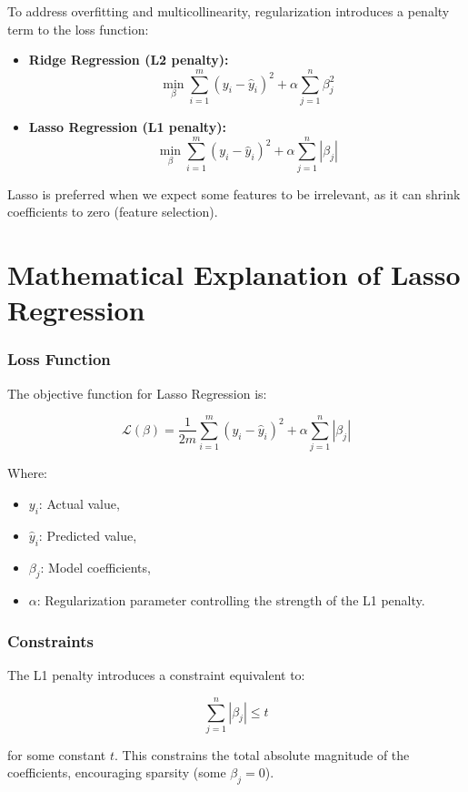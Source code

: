 \documentclass[12pt, a4paper]{report}
\begin{document}
To address overfitting and multicollinearity, regularization introduces a penalty term to the loss function:

\begin{itemize}
    \item \textbf{Ridge Regression (L2 penalty):}
    \[
    \min_{\beta} \sum_{i=1}^{m} (y_i - \hat{y}_i)^2 + \alpha \sum_{j=1}^{n} \beta_j^2
    \]
    \item \textbf{Lasso Regression (L1 penalty):}
    \[
    \min_{\beta} \sum_{i=1}^{m} (y_i - \hat{y}_i)^2 + \alpha \sum_{j=1}^{n} |\beta_j|
    \]
\end{itemize}

Lasso is preferred when we expect some features to be irrelevant, as it can shrink coefficients to zero (feature selection).

\section{ Mathematical Explanation of Lasso Regression}

\subsubsection*{Loss Function}

The objective function for Lasso Regression is:

\[
\mathcal{L}(\beta) = \frac{1}{2m} \sum_{i=1}^{m} (y_i - \hat{y}_i)^2 + \alpha \sum_{j=1}^{n} |\beta_j|
\]

Where:
\begin{itemize}
    \item \( y_i \): Actual value,
    \item \( \hat{y}_i \): Predicted value,
    \item \( \beta_j \): Model coefficients,
    \item \( \alpha \): Regularization parameter controlling the strength of the L1 penalty.
\end{itemize}

\subsubsection*{Constraints}

The L1 penalty introduces a constraint equivalent to:

\[
\sum_{j=1}^{n} |\beta_j| \leq t
\]

for some constant \( t \). This constrains the total absolute magnitude of the coefficients, encouraging sparsity (some \( \beta_j = 0 \)).
\end{document}
